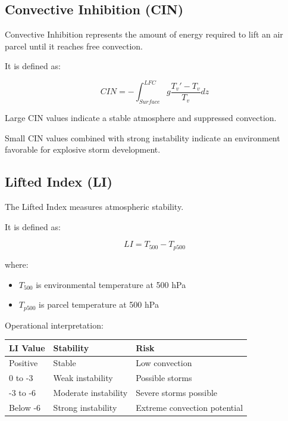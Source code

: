 \subsection{Convective Inhibition (CIN)}

Convective Inhibition represents the amount of energy required to lift
an air parcel until it reaches free convection.

It is defined as:

\[
CIN =
-\int_{Surface}^{LFC}
g
\frac{T_v'-T_v}{T_v}
dz
\]

Large CIN values indicate a stable atmosphere and suppressed convection.

Small CIN values combined with strong instability indicate an environment
favorable for explosive storm development.


\subsection{Lifted Index (LI)}

The Lifted Index measures atmospheric stability.

It is defined as:

\[
LI=T_{500}-T_{p500}
\]

where:

\begin{itemize}

\item $T_{500}$ is environmental temperature at 500 hPa

\item $T_{p500}$ is parcel temperature at 500 hPa

\end{itemize}


Operational interpretation:

\begin{center}

\begin{tabular}{lll}

\toprule

LI Value & Stability & Risk \\

\midrule

Positive & Stable & Low convection \\

0 to -3 & Weak instability & Possible storms \\

-3 to -6 & Moderate instability & Severe storms possible \\

Below -6 & Strong instability & Extreme convection potential \\

\bottomrule

\end{tabular}

\end{center}


